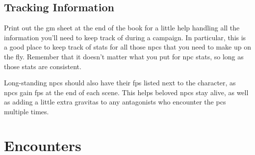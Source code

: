 \begin{multicols}{2}
\subsection{Tracking Information}

Print out the \gls{gm} sheet at the end of the book for a little help handling all the information you'll need to keep track of during a campaign.
In particular, this is a good place to keep track of stats for all those \glspl{npc} that you need to make up on the fly.
Remember that it doesn't matter what you put for \gls{npc} stats, so long as those stats are consistent.

Long-standing \glspl{npc} should also have their \glspl{fp} listed next to the character, as \glspl{npc} gain \glspl{fp} at the end of each scene.
This helps beloved \glspl{npc} stay alive, as well as adding a little extra gravitas to any antagonists who encounter the \glspl{pc} multiple times.

\end{multicols}

\section{Encounters}

